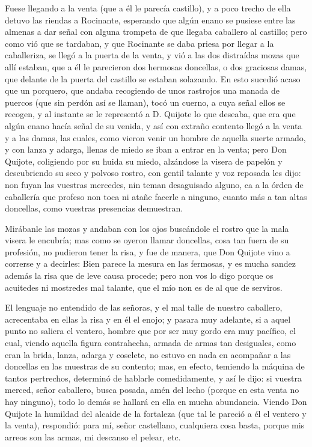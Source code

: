     Fuese llegando a la venta (que a él le parecía castillo), y a poco
    trecho de ella detuvo las riendas a Rocinante, esperando que algún
    enano se pusiese entre las almenas a dar señal con alguna trompeta
    de que llegaba caballero al castillo; pero como vió que se
    tardaban, y que Rocinante se daba priesa por llegar a la
    caballeriza, se llegó a la puerta de la venta, y vió a las dos
    distraídas mozas que allí estaban, que a él le parecieron dos
    hermosas doncellas, o dos graciosas damas, que delante de la
    puerta del castillo se estaban solazando. En esto sucedió acaso
    que un porquero, que andaba recogiendo de unos rastrojos una
    manada de puercos (que sin perdón así se llaman), tocó un cuerno,
    a cuya señal ellos se recogen, y al instante se le representó a D.
    Quijote lo que deseaba, que era que algún enano hacía señal de su
    venida, y así con extraño contento llegó a la venta y a las damas,
    las cuales, como vieron venir un hombre de aquella suerte armado,
    y con lanza y adarga, llenas de miedo se iban a entrar en la
    venta; pero Don Quijote, coligiendo por su huida su miedo,
    alzándose la visera de papelón y descubriendo su seco y polvoso
    rostro, con gentil talante y voz reposada les dijo: non fuyan las
    vuestras mercedes, nin teman desaguisado alguno, ca a la órden de
    caballería que profeso non toca ni atañe facerle a ninguno, cuanto
    más a tan altas doncellas, como vuestras presencias demuestran.
    
    Mirábanle las mozas y andaban con los ojos buscándole el rostro
    que la mala visera le encubría; mas como se oyeron llamar
    doncellas, cosa tan fuera de su profesión, no pudieron tener la
    risa, y fue de manera, que Don Quijote vino a correrse y a
    decirles: Bien parece la mesura en las fermosas, y es mucha sandez
    además la risa que de leve causa procede; pero non vos lo digo
    porque os acuitedes ni mostredes mal talante, que el mío non es de
    al que de serviros.
    
    El lenguaje no entendido de las señoras, y el mal talle de nuestro
    caballero, acrecentaba en ellas la risa y en él el enojo; y pasara
    muy adelante, si a aquel punto no saliera el ventero, hombre que
    por ser muy gordo era muy pacífico, el cual, viendo aquella figura
    contrahecha, armada de armas tan desiguales, como eran la brida,
    lanza, adarga y coselete, no estuvo en nada en acompañar a las
    doncellas en las muestras de su contento; mas, en efecto, temiendo
    la máquina de tantos pertrechos, determinó de hablarle
    comedidamente, y así le dijo: si vuestra merced, señor caballero,
    busca posada, amén del lecho (porque en esta venta no hay
    ninguno), todo lo demás se hallará en ella en mucha abundancia.
    Viendo Don Quijote la humildad del alcaide de la fortaleza (que
    tal le pareció a él el ventero y la venta), respondió: para mí,
    señor castellano, cualquiera cosa basta, porque mis arreos son las
    armas, mi descanso el pelear, etc.
    
